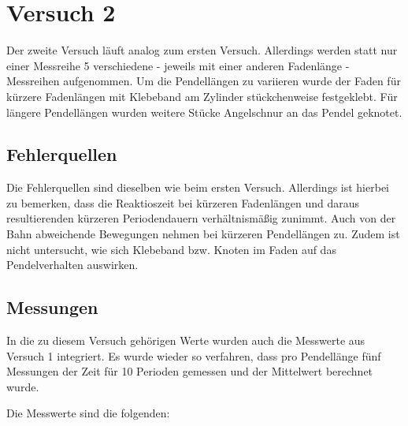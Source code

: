 \documentclass[
  9pt,
]{article}
\begin{document}
\newpage

\hypertarget{versuch-2}{%
\section{Versuch 2}\label{versuch-2}}

Der zweite Versuch läuft analog zum ersten Versuch. Allerdings werden
statt nur einer Messreihe 5 verschiedene - jeweils mit einer anderen
Fadenlänge - Messreihen aufgenommen. Um die Pendellängen zu variieren
wurde der Faden für kürzere Fadenlängen mit Klebeband am Zylinder
stückchenweise festgeklebt. Für längere Pendellängen wurden weitere
Stücke Angelschnur an das Pendel geknotet.

\hypertarget{fehlerquellen-1}{%
\subsection{Fehlerquellen}\label{fehlerquellen-1}}

Die Fehlerquellen sind dieselben wie beim ersten Versuch. Allerdings ist
hierbei zu bemerken, dass die Reaktioszeit bei kürzeren Fadenlängen und
daraus resultierenden kürzeren Periodendauern verhältnismäßig zunimmt.
Auch von der Bahn abweichende Bewegungen nehmen bei kürzeren
Pendellängen zu. Zudem ist nicht untersucht, wie sich Klebeband bzw.
Knoten im Faden auf das Pendelverhalten auswirken.

\hypertarget{messungen-1}{%
\subsection{Messungen}\label{messungen-1}}

In die zu diesem Versuch gehörigen Werte wurden auch die Messwerte aus
Versuch 1 integriert. Es wurde wieder so verfahren, dass pro Pendellänge
fünf Messungen der Zeit für 10 Perioden gemessen und der Mittelwert
berechnet wurde.

Die Messwerte sind die folgenden:
\end{document}
